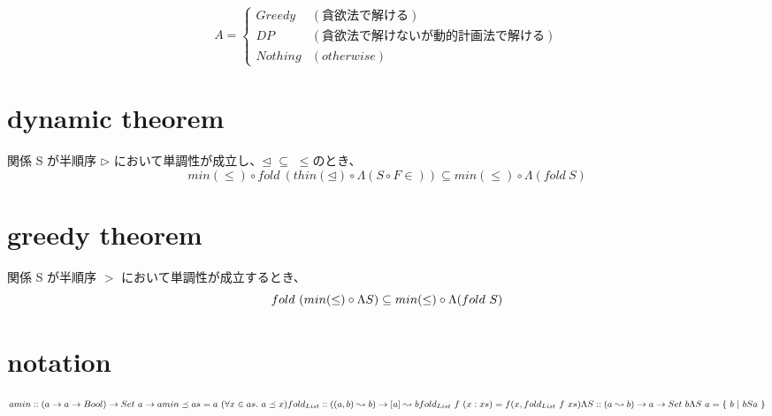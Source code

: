 \documentclass[11pt,a4paper]{jarticle}
\begin{document}
\section{}
\[
  A = \begin{cases}
    Greedy & (貪欲法で解ける) \\
    DP & (貪欲法で解けないが動的計画法で解ける) \\
    Nothing & (otherwise)
  \end{cases}
\]
\section{dynamic theorem}
関係 S が半順序 $\rhd$ において単調性が成立し、$\unlhd$ $\subseteq$ $\leq$のとき、
\[
  min (\leq) \circ fold\ (thin (\unlhd) \circ \Lambda (S \circ F \in)) \subseteq min (\leq) \circ \Lambda (fold \ S )
\]

\section{greedy theorem}
関係 S が半順序 $>$ において単調性が成立するとき、
\[
  fold\ (min (\leq) \circ \Lambda S) \\ \subseteq min (\leq) \circ \Lambda (fold\ S) 
\]
\section{notation}
\[
a\\
min :: (a \rightarrow a \rightarrow Bool) \rightarrow Set\ a \rightarrow a\\
min \preceq as = a \ (\forall x \in as .\ a \preceq x) \\
\\
fold_{List} :: ( (a,b) \leadsto b) \rightarrow[a] \leadsto b \\
fold_{List}\ f\ (x:xs) = f ( x , fold_{List} \ f\ xs) \\
\\
\Lambda S :: (a \leadsto b) \rightarrow a \rightarrow Set\ b \\
\Lambda S\ a = \{ \ b \ |\ b S a \  \}
\]
\end{document}
